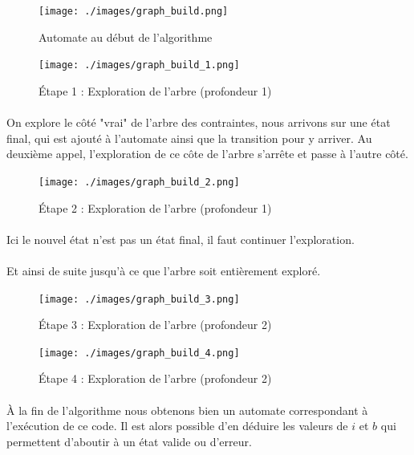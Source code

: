 \begin{figure}[H]
 \centering
 \texttt{[image: ./images/graph\_build.png]}
 \caption{Automate au début de l'algorithme}
\end{figure}


 
 \begin{figure}[H]
  \centering
  \texttt{[image: ./images/graph\_build\_1.png]}
  \caption{Étape 1 : Exploration de l'arbre (profondeur 1)}
 \end{figure}

 \paragraph{} On explore le côté "vrai" de l'arbre des contraintes, nous 
arrivons sur une état final, qui est 
ajouté à l'automate ainsi que la transition pour y arriver. Au deuxième appel, 
l'exploration de ce côte de l'arbre s'arrête et passe à l'autre côté.


 \begin{figure}[H]
  \centering
  \texttt{[image: ./images/graph\_build\_2.png]}
  \caption{Étape 2 : Exploration de l'arbre (profondeur 1)}
 \end{figure}
 \paragraph{} Ici le nouvel état n'est pas un état final, il faut continuer 
l'exploration.
 \paragraph{} Et ainsi de suite jusqu'à ce que l'arbre soit 
entièrement exploré.


 \begin{figure}[H]
  \centering
  \texttt{[image: ./images/graph\_build\_3.png]}
  \caption{Étape 3 : Exploration de l'arbre (profondeur 2)}
 \end{figure}

\begin{figure}[H]
  \centering
  \texttt{[image: ./images/graph\_build\_4.png]}
  \caption{Étape 4 : Exploration de l'arbre (profondeur 2)}
  \label{fig:automate_construit}
 \end{figure}


\paragraph{}
À la fin de l'algorithme nous obtenons bien un automate correspondant à 
l'exécution de ce code. Il est alors possible d'en déduire les valeurs de $i$ 
et 
$b$ qui permettent d'aboutir à un état valide ou d'erreur.

